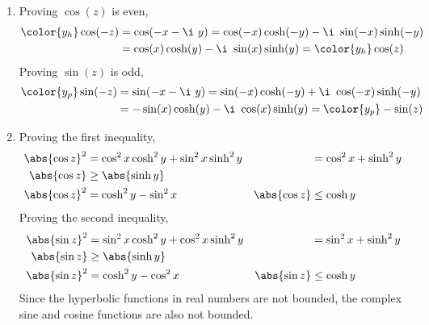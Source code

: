 \begin{enumerate}
    \item Proving $ \cos(z) $ is even,
          \begin{align}
              \color{y_h} \cos(-z) & = \cos(-x -\i\ y) = \cos(-x)\cosh(-y) -\i
              \ \sin(-x)\sinh(-y)                                              \\
                                   & = \cos(x) \cosh(y) - \i\ \sin(x)\sinh(y)
              = \color{y_h} \cos(z)
          \end{align}
          Proving $ \sin(z) $ is odd,
          \begin{align}
              \color{y_p} \sin(-z) & = \sin(-x -\i\ y) = \sin(-x)\cosh(-y) + \i
              \ \cos(-x)\sinh(-y)                                               \\
                                   & = -\sin(x) \cosh(y) - \i\ \cos(x)\sinh(y)
              = \color{y_p} -\sin(z)
          \end{align}

    \item Proving the first inequality,
          \begin{align}
              \abs{\cos z}^2 & = \cos^2 x \cosh^2 y + \sin^2 x \sinh^2 y &
                             & = \cos^2 x + \sinh^2 y                      \\
              \abs{\cos z}   & \geq \abs{\sinh y}                          \\
              \abs{\cos z}^2 & = \cosh^2 y - \sin^2 x                    &
              \abs{\cos z}   & \leq \cosh y
          \end{align}
          Proving the second inequality,
          \begin{align}
              \abs{\sin z}^2 & = \sin^2 x \cosh^2 y + \cos^2 x \sinh^2 y &
                             & = \sin^2 x + \sinh^2 y                      \\
              \abs{\sin z}   & \geq \abs{\sinh y}                          \\
              \abs{\sin z}^2 & = \cosh^2 y - \cos^2 x                    &
              \abs{\sin z}   & \leq \cosh y
          \end{align}
          Since the hyperbolic functions in real numbers are not bounded, the
          complex sine and cosine functions are also not bounded.


\end{enumerate}
